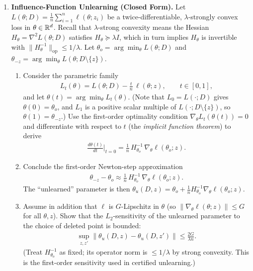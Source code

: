 \documentclass[12pt]{article}
\begin{document}
\begin{enumerate}
\item \textbf{Influence-Function Unlearning (Closed Form).}
Let $L(\theta; D) = \frac{1}{n}\sum_{i=1}^n \ell(\theta; z_i)$ be a twice-differentiable, $\lambda$-strongly convex loss in $\theta \in {\mathbb{R}}^d$. Recall that $\lambda$-strong convexity means the Hessian $H_\theta = \nabla^2 L(\theta; D)$ satisfies $H_\theta \succeq \lambda I$, which in turn implies $H_\theta$ is invertible with $\|H_\theta^{-1}\|_{\mathrm{op}} \le 1/\lambda$. Let $\theta_o = \arg\min_\theta L(\theta; D)$ and $\theta_{-z} = \arg\min_\theta L(\theta; D \setminus \{z\})$.
\begin{enumerate}
    \item Consider the parametric family
    \begin{align*}
        L_t(\theta) = L(\theta; D) - \frac{t}{n}\,\ell(\theta; z), \qquad t \in [0, 1],
    \end{align*}
    and let $\theta(t) = \arg\min_\theta L_t(\theta)$. (Note that $L_0 = L(\cdot; D)$ gives $\theta(0) = \theta_o$, and $L_1$ is a positive scalar multiple of $L(\cdot; D \setminus \{z\})$, so $\theta(1) = \theta_{-z}$.) Use the first-order optimality condition $\nabla_\theta L_t(\theta(t)) = 0$ and differentiate with respect to $t$ (the \emph{implicit function theorem}) to derive
    \begin{align*}
        \frac{d\theta(t)}{dt}\bigg|_{t=0} = \frac{1}{n}\,H_{\theta_o}^{-1}\,\nabla_\theta \ell(\theta_o; z).
    \end{align*}

    \item Conclude the first-order Newton-step approximation
    \begin{align*}
        \theta_{-z} - \theta_o \approx \frac{1}{n}\,H_{\theta_o}^{-1}\,\nabla_\theta \ell(\theta_o; z).
    \end{align*}
    The ``unlearned'' parameter is then $\theta_u(D, z) = \theta_o + \frac{1}{n}H_{\theta_o}^{-1}\nabla_\theta \ell(\theta_o; z)$.

    \item Assume in addition that $\ell$ is $G$-Lipschitz in $\theta$ (so $\|\nabla_\theta \ell(\theta; z)\| \le G$ for all $\theta, z$). Show that the $L_2$-sensitivity of the unlearned parameter to the choice of deleted point is bounded:
    \begin{align*}
        \sup_{z, z'} \|\theta_u(D, z) - \theta_u(D, z')\| \le \frac{2 G}{\lambda n}.
    \end{align*}
    (Treat $H_{\theta_o}^{-1}$ as fixed; its operator norm is $\le 1/\lambda$ by strong convexity. This is the first-order sensitivity used in certified unlearning.)
\end{enumerate}


\end{enumerate}
\end{document}
